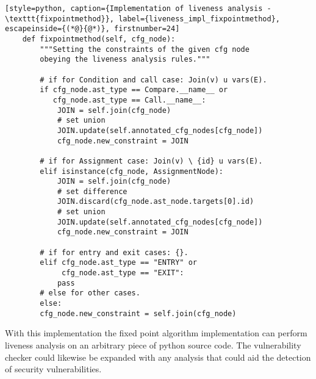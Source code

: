 \begin{lstlisting}[style=python, caption={Implementation of liveness analysis - \texttt{fixpointmethod}}, label={liveness_impl_fixpointmethod}, escapeinside={(*@}{@*)}, firstnumber=24]
    def fixpointmethod(self, cfg_node):
        """Setting the constraints of the given cfg node
        obeying the liveness analysis rules."""
    
        # if for Condition and call case: Join(v) u vars(E).
        if cfg_node.ast_type == Compare.__name__ or
           cfg_node.ast_type == Call.__name__:
            JOIN = self.join(cfg_node)
            # set union
            JOIN.update(self.annotated_cfg_nodes[cfg_node])  
            cfg_node.new_constraint = JOIN

        # if for Assignment case: Join(v) \ {id} u vars(E).
        elif isinstance(cfg_node, AssignmentNode): 
            JOIN = self.join(cfg_node)
            # set difference
            JOIN.discard(cfg_node.ast_node.targets[0].id)
            # set union
            JOIN.update(self.annotated_cfg_nodes[cfg_node])  
            cfg_node.new_constraint = JOIN

        # if for entry and exit cases: {}.
        elif cfg_node.ast_type == "ENTRY" or
             cfg_node.ast_type == "EXIT":
            pass
        # else for other cases.
        else:
        cfg_node.new_constraint = self.join(cfg_node)
\end{lstlisting}

With this implementation the \pyt{} fixed point algorithm implementation can perform liveness analysis on an arbitrary piece of python source code.
The \pyt{} vulnerability checker could likewise be expanded with any analysis that could aid the detection of security vulnerabilities.
